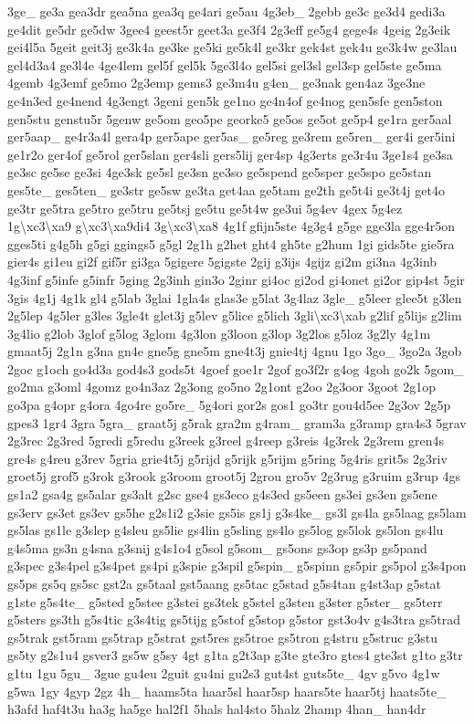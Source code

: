 {3ge\-\_\- ge3a gea3dr gea5na gea3q ge4ari ge5au 4g3eb\-\_\- 2gebb ge3c ge3d4 gedi3a ge4dit ge5dr ge5dw 3gee4 geest5r geet3a ge3f4 2g3eff ge5g4 gege4s 4geig 2g3eik gei4l5a 5geit geit3j ge3k4a ge3ke ge5ki ge5k4l ge3kr gek4st gek4u ge3k4w ge3lau gel4d3a4 ge3l4e 4ge4lem gel5f gel5k 5ge3l4o gel5si gel3sl gel3sp gel5ste ge5ma 4gemb 4g3emf ge5mo 2g3emp gems3 ge3m4u g4en\-\_\- ge3nak gen4az 3ge3ne ge4n3ed ge4nend 4g3engt 3geni gen5k ge1no ge4n4of ge4nog gen5sfe gen5ston gen5stu genstu5r 5genw ge5om geo5pe georke5 ge5os ge5ot ge5p4 ge1ra ger5aal ger5aap\-\_\- ge4r3a4l gera4p ger5ape ger5as\-\_\- ge5reg ge3rem ge5ren\-\_\- ger4i ger5ini ge1r2o ger4of ge5rol ger5slan ger4sli gers5lij ger4sp 4g3erts ge3r4u 3ge1s4 ge3sa ge3sc ge5se ge3si 4ge3sk ge5sl ge3sn ge3so ge5spend ge5sper ge5spo ge5stan ges5te\-\_\- ges5ten\-\_\- ge3str ge5sw ge3ta get4aa ge5tam ge2th ge5t4i ge3t4j get4o ge3tr ge5tra ge5tro ge5tru ge5tsj ge5tu ge5t4w ge3ui 5g4ev 4gex 5g4ez 1g\textbackslash{}xc3\textbackslash{}xa9 g\textbackslash{}xc3\textbackslash{}xa9di4 3g\textbackslash{}xc3\textbackslash{}xa8 4g1f gfijn5ste 4g3g4 g5ge gge3la gge4r5on gges5ti g4g5h g5gi ggings5 g5gl 2g1h g2het ght4 gh5te g2hum 1gi gids5te gie5ra gier4s gi1eu gi2f gif5r gi3ga 5gigere 5gigste 2gij g3ijs 4gijz gi2m gi3na 4g3inb 4g3inf g5infe g5infr 5ging 2g3inh gin3o 2ginr gi4oc gi2od gi4onet gi2or gip4st 5gir 3gis 4g1j 4g1k gl4 g5lab 3glai 1gla4s glas3e g5lat 3g4laz 3gle\-\_\- g5leer glee5t g3len 2g5lep 4g5ler g3les 3gle4t glet3j g5lev g5lice g5lich 3gli\textbackslash{}xc3\textbackslash{}xab g2lif g5lijs g2lim 3g4lio g2lob 3glof g5log 3glom 4g3lon g3loon g3lop 3g2los g5loz 3g2ly 4g1m gmaat5j 2g1n g3na gn4e gne5g gne5m gne4t3j gnie4tj 4gnu 1go 3go\-\_\- 3go2a 3gob 2goc g1och go4d3a god4s3 gods5t 4goef goe1r 2gof go3f2r g4og 4goh go2k 5gom\-\_\- go2ma g3oml 4gomz go4n3az 2g3ong go5no 2g1ont g2oo 2g3oor 3goot 2g1op go3pa g4opr g4ora 4go4re go5re\-\_\- 5g4ori gor2s gos1 go3tr gou4d5ee 2g3ov 2g5p gpes3 1gr4 3gra 5gra\-\_\- graat5j g5rak gra2m g4ram\-\_\- gram3a g3ramp gra4s3 5grav 2g3rec 2g3red 5gredi g5redu g3reek g3reel g4reep g3reis 4g3rek 2g3rem gren4s gre4s g4reu g3rev 5gria grie4t5j g5rijd g5rijk g5rijm g5ring 5g4ris grit5s 2g3riv groet5j grof5 g3rok g3rook g3room groot5j 2grou gro5v 2g3rug g3ruim g3rup 4gs gs1a2 gsa4g gs5alar gs3alt g2sc gse4 gs3eco g4s3ed gs5een gs3ei gs3en gs5ene gs3erv gs3et gs3ev gs5he g2s1i2 g3sie gs5is gs1j g3s4ke\-\_\- gs3l gs4la gs5laag gs5lam gs5las gs1le g3slep g4sleu gs5lie gs4lin g5sling gs4lo gs5log gs5lok gs5lon gs4lu g4s5ma gs3n g4sna g3snij g4s1o4 g5sol g5som\-\_\- gs5ons gs3op gs3p gs5pand g3spec g3s4pel g3s4pet gs4pi g3spie g3spil g5spin\-\_\- g5spinn gs5pir gs5pol g3s4pon gs5ps gs5q gs5sc gst2a gs5taal gst5aang gs5tac g5stad g5s4tan g4st3ap g5stat g1ste g5s4te\-\_\- g5sted g5stee g3stei gs3tek g5stel g3sten g3ster g5ster\-\_\- gs5terr g5sters gs3th g5s4tic g3s4tig gs5tijg g5stof g5stop g5stor gst3o4v g4s3tra gs5trad gs5trak gst5ram gs5trap g5strat gst5res gs5troe gs5tron g4stru g5struc g3stu gs5ty g2s1u4 gsver3 gs5w g5sy 4gt g1ta g2t3ap g3te gte3ro gtes4 gte3st g1to g3tr g1tu 1gu 5gu\-\_\- 3gue gu4eu 2guit gu4ni gu2s3 gut4st guts5te\-\_\- 4gv g5vo 4g1w g5wa 1gy 4gyp 2gz 4h\-\_\- haams5ta haar5sl haar5sp haars5te haar5tj haats5te\-\_\- h3afd haf4t3u ha3g ha5ge hal2f1 5hals hal4sto 5halz 2hamp 4han\-\_\- han4dr }
